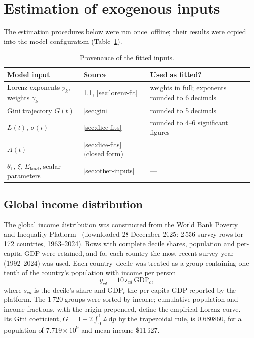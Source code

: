 \documentclass[11pt]{article}
\newcommand{\dd}{\mathrm{d}}
\newcommand{\Lor}{\mathcal{L}}
\newcommand{\Eland}{E_{\mathrm{land}}}
\begin{document}
\section{Estimation of exogenous inputs}
\label{sec:estimation}

The estimation procedures below were run once, offline; their results were
copied into the model configuration (Table~\ref{tab:provenance}).

\begin{table}[ht]
\centering
\caption{Provenance of the fitted inputs.}
\label{tab:provenance}
\small
\begin{tabular}{p{} l p{}}
\toprule
Model input & Source & Used as fitted? \\
\midrule
Lorenz exponents $p_k$, weights $\gamma_k$ & \ref{sec:pip}, \ref{sec:lorenz-fit} &
  weights in full; exponents rounded to 6 decimals \\
Gini trajectory $G(t)$ & \ref{sec:gini} & rounded to 5 decimals \\
$L(t)$, $\sigma(t)$ & \ref{sec:dice-fits} & rounded to 4--6 significant figures \\
$A(t)$ & \ref{sec:dice-fits} (closed form) & --- \\
$\theta_1$, $\xi$, $\Eland$, scalar parameters & \ref{sec:other-inputs} & --- \\
\bottomrule
\end{tabular}
\end{table}

\subsection{Global income distribution}
\label{sec:pip}

The global income distribution was constructed from the World Bank Poverty
and Inequality Platform~\cite{PIP} (downloaded 28 December 2025: 2\,556
survey rows for 172 countries, 1963--2024). Rows with complete decile shares,
population and per-capita GDP were retained, and for each country the most
recent survey year (1992--2024) was used. Each country--decile was treated as
a group containing one tenth of the country's population with income per
person
\begin{equation}
  y_{cd} = 10\,s_{cd}\,\mathrm{GDP}_c ,
\end{equation}
where $s_{cd}$ is the decile's share and $\mathrm{GDP}_c$ the per-capita GDP
reported by the platform. The 1\,720 groups were sorted by income; cumulative
population and income fractions, with the origin prepended, define the
empirical Lorenz curve. Its Gini coefficient, $G = 1 - 2\int_0^1\Lor\,\dd p$
by the trapezoidal rule, is 0.680860, for a population of
$7.719\times10^{9}$ and mean income \$11\,627.
\end{document}
